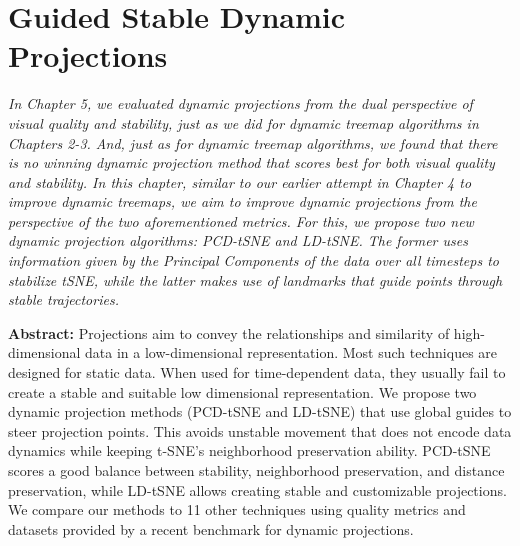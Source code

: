 \chapter{Guided Stable Dynamic Projections}


\textit{
In Chapter 5, we evaluated dynamic projections from the dual perspective of visual quality and stability, just as we did for dynamic treemap algorithms in Chapters 2-3. And, just as for dynamic treemap algorithms, we found that there is no winning dynamic projection method that scores best for both visual quality and stability. In this chapter, similar to our earlier attempt in Chapter 4 to improve dynamic treemaps, we aim to improve dynamic projections from the perspective of the two aforementioned metrics.  For this, we propose two new dynamic projection algorithms: PCD-tSNE and LD-tSNE. The former uses information given by the Principal Components of the data over all timesteps to stabilize tSNE, while the latter makes use of landmarks that guide points through stable trajectories. 
}

\vspace{5mm} %


\noindent \textbf{Abstract:}
Projections aim to convey the relationships and similarity of high-dimensional data in a low-dimensional representation.
Most such techniques are designed for static data. When used for time-dependent data, they usually fail to create a stable and suitable low dimensional representation.
We propose two dynamic projection methods (PCD-tSNE and LD-tSNE) that use global guides to steer projection points. This avoids unstable movement that does not encode data dynamics while keeping t-SNE's neighborhood preservation ability. PCD-tSNE scores a good balance between stability, neighborhood preservation, and distance preservation, while LD-tSNE allows creating stable and customizable projections. We compare our methods to 11 other techniques using quality metrics and datasets provided by a recent benchmark for dynamic projections.
    
